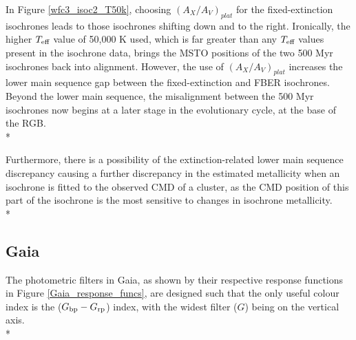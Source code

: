\documentclass[12pt, a4paper]{report}
\begin{document}
In Figure \ref{wfc3_isoc2_T50k}, choosing $(A_{X}/A_{V})_{plat}$ for the fixed-extinction isochrones leads to those isochrones shifting down and to the right. Ironically, the higher $T_{\textnormal{eff}}$ value of 50,000 K used, which is far greater than any $T_{\textnormal{eff}}$ values present in the isochrone data, brings the MSTO positions of the two 500 Myr isochrones back into alignment. However, the use of $(A_{X}/A_{V})_{plat}$ increases the lower main sequence gap between the fixed-extinction and FBER isochrones. Beyond the lower main sequence, the misalignment between the 500 Myr isochrones now begins at a later stage in the evolutionary cycle, at the base of the RGB. \\*

Furthermore, there is a possibility of the extinction-related lower main sequence discrepancy causing a further discrepancy in the estimated metallicity when an isochrone is fitted to the observed CMD of a cluster, as the CMD position of this part of the isochrone is the most sensitive to changes in isochrone metallicity.\\*

\subsection{Gaia} \label{Gaia_isoc}

The photometric filters in Gaia, as shown by their respective response functions in Figure \ref{Gaia_response_funcs}, are designed such that the only useful colour index is the ($G_{\textnormal{bp}}-G_{\textnormal{rp}}$) index, with the widest filter ($G$) being on the vertical axis.\\*
\end{document}
